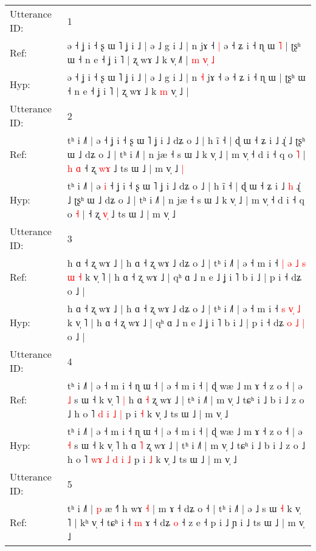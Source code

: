 \documentclass[10pt]{article}
\DeclareRobustCommand{\hl}[1]{{\textcolor{red}{#1}}}
\begin{document}
\begin{longtable}{ll}
\toprule
Utterance ID: & 1 \\
Ref: & ə ˧ ʝ i ˧ ʂ ɯ ˥ ʝ i ˩ | ə ˩ g i ˩ | n\hl{}\hl{} jɤ ˧\hl{ }\hl{|} ə ˧ ʑ i ˧ ɳ ɯ\hl{ }\hl{˥} | ʈʂʰ ɯ ˧ n e ˧ ʝ i ˥ | ʐ wɤ ˩ k\hl{}\hl{} v̩ ˩\hl{˥} |\hl{ }\hl{m}\hl{ }\hl{v}\hl{̩}\hl{ }\hl{˩}
 \\
Hyp: & ə ˧ ʝ i ˧ ʂ ɯ ˥ ʝ i ˩ | ə ˩ g i ˩ | n\hl{ }\hl{˧} jɤ ˧\hl{}\hl{} ə ˧ ʑ i ˧ ɳ ɯ\hl{}\hl{} | ʈʂʰ ɯ ˧ n e ˧ ʝ i ˥ | ʐ wɤ ˩ k\hl{ }\hl{m} v̩ ˩\hl{} |\hl{}\hl{}\hl{}\hl{}\hl{}\hl{}\hl{}
 \\
\midrule
Utterance ID: & 2 \\
Ref: & tʰ i ˩˥ | ə\hl{}\hl{} ˧ ʝ i ˧ ʂ ɯ ˥ ʝ i ˩ dʑ o ˩ | h ĩ ˧ | ɖ ɯ ˧ ʑ i ˩\hl{}\hl{} ɻ̍ ˩ ʈʂʰ ɯ ˩ dʑ o ˩ | tʰ i ˩˥ | n jæ ˧ s ɯ ˩ k v̩ ˩ | m v̩ ˧ d i ˧ q o \hl{˥} |\hl{ }\hl{h}\hl{ }\hl{ɑ} ˧ ʐ \hl{w}\hl{ɤ} ˩ ts ɯ ˩ | m v̩ ˩\hl{ }\hl{|}
 \\
Hyp: & tʰ i ˩˥ | ə\hl{ }\hl{i} ˧ ʝ i ˧ ʂ ɯ ˥ ʝ i ˩ dʑ o ˩ | h ĩ ˧ | ɖ ɯ ˧ ʑ i ˩\hl{ }\hl{h} ɻ̍ ˩ ʈʂʰ ɯ ˩ dʑ o ˩ | tʰ i ˩˥ | n jæ ˧ s ɯ ˩ k v̩ ˩ | m v̩ ˧ d i ˧ q o \hl{˧} |\hl{}\hl{}\hl{}\hl{} ˧ ʐ \hl{v}\hl{̩} ˩ ts ɯ ˩ | m v̩ ˩\hl{}\hl{}
 \\
\midrule
Utterance ID: & 3 \\
Ref: & h ɑ ˧ ʐ wɤ ˩ | h ɑ ˧ ʐ wɤ ˩ dʑ o ˩ | tʰ i ˩˥ | ə ˧ m i ˧\hl{ }\hl{|}\hl{ }\hl{ə} \hl{˩} \hl{s}\hl{ }\hl{ɯ} \hl{˧} k v̩ ˥ | h ɑ ˧ ʐ wɤ ˩ | qʰ ɑ ˩ n e ˩ ʝ i ˥ b i ˩ | p i ˧ dʑ\hl{}\hl{}\hl{}\hl{}\hl{}\hl{} o ˩ |
 \\
Hyp: & h ɑ ˧ ʐ wɤ ˩ | h ɑ ˧ ʐ wɤ ˩ dʑ o ˩ | tʰ i ˩˥ | ə ˧ m i ˧\hl{}\hl{}\hl{}\hl{} \hl{s} \hl{}\hl{v}\hl{̩} \hl{˩} k v̩ ˥ | h ɑ ˧ ʐ wɤ ˩ | qʰ ɑ ˩ n e ˩ ʝ i ˥ b i ˩ | p i ˧ dʑ\hl{ }\hl{o}\hl{ }\hl{˩}\hl{ }\hl{|} o ˩ |
 \\
\midrule
Utterance ID: & 4 \\
Ref: & tʰ i ˩˥ | ə ˧ m i ˧ ɳ ɯ ˧ | ə ˧ m i ˧ | ɖ wæ ˩ m ɤ ˧ z o ˧ | ə \hl{˩} s ɯ ˧ k v̩ ˥\hl{ }\hl{|} h ɑ \hl{˧} ʐ wɤ ˩ | tʰ i ˩˥ | m v̩ ˩ tɕʰ i ˩ b i ˩ z o ˩ h o ˥\hl{}\hl{}\hl{} \hl{d} \hl{i} \hl{˩} \hl{|} p i \hl{˧} k v̩ ˩ ts ɯ ˩ | m v̩ ˩
 \\
Hyp: & tʰ i ˩˥ | ə ˧ m i ˧ ɳ ɯ ˧ | ə ˧ m i ˧ | ɖ wæ ˩ m ɤ ˧ z o ˧ | ə \hl{˧} s ɯ ˧ k v̩ ˥\hl{}\hl{} h ɑ \hl{˥} ʐ wɤ ˩ | tʰ i ˩˥ | m v̩ ˩ tɕʰ i ˩ b i ˩ z o ˩ h o ˥\hl{ }\hl{w}\hl{ɤ} \hl{˩} \hl{d} \hl{i} \hl{˩} p i \hl{˩} k v̩ ˩ ts ɯ ˩ | m v̩ ˩
 \\
\midrule
Utterance ID: & 5 \\
Ref: & tʰ i ˩˥ | \hl{}\hl{}\hl{}\hl{p} æ ˧\hl{˥} h wɤ \hl{˧} | m ɤ ˧ dʑ o ˧ | tʰ i ˩˥ | ə ˩ s ɯ \hl{˧} k v̩ ˥ | kʰ v̩ ˧ tɕʰ i ˧\hl{}\hl{} \hl{m} ɤ ˧ dʑ \hl{o} ˧ z e ˧ p i ˩ ɲ i ˩ ts ɯ ˩ | m v̩ ˩

\end{longtable}
\end{document}
